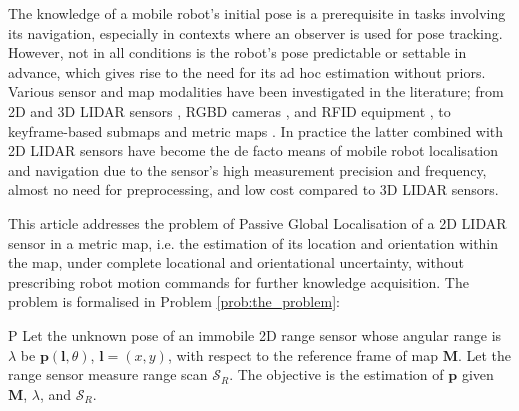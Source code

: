The knowledge of a mobile robot's initial pose is a prerequisite in tasks
involving its navigation, especially in contexts where an observer is used for
pose tracking. However, not in all conditions is the robot's pose predictable
or settable in advance, which gives rise to the need for its ad hoc estimation
without priors. Various sensor and map modalities have been investigated in the
literature; from 2D and 3D LIDAR sensors \cite{als_eth,Cop2018a}, RGBD cameras
\cite{Guo2016}, and RFID equipment \cite{Tzitzis2023b}, to keyframe-based
submaps \cite{Lowry2016} and metric maps \cite{Rosen2021}. In practice the
latter combined with 2D LIDAR sensors have become the de facto means of mobile
robot localisation and navigation due to the sensor's high measurement
precision and frequency, almost no need for preprocessing, and low cost
compared to 3D LIDAR sensors.

This article addresses the problem of Passive Global Localisation of a 2D LIDAR
sensor in a metric map, i.e. the estimation of its location and orientation
within the map, under complete locational and orientational uncertainty,
without prescribing robot motion commands
for further knowledge acquisition. The problem is
formalised in Problem \ref{prob:the_problem}:

\begin{customprb}{P}
  \label{prob:the_problem}
  Let the unknown pose of an immobile 2D range sensor whose angular range is
  $\lambda$ be $\bm{p}(\bm{l},\theta)$, $\bm{l} = (x,y)$, with respect to the
  reference frame of map $\bm{M}$. Let the range sensor measure range scan
  $\mathcal{S}_R$. The objective is the estimation of $\bm{p}$ given $\bm{M}$,
  $\lambda$, and $\mathcal{S}_R$.
\end{customprb}

